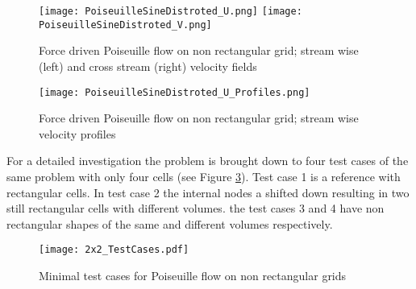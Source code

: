 \documentclass[
	pdftex,             %
	12pt,				%
	a4paper,		   	%
	english,				%
	oneside,			%
]{article}
\begin{document}
\begin{figure}[ht!]
\texttt{[image: PoiseuilleSineDistroted\_U.png]}
\texttt{[image: PoiseuilleSineDistroted\_V.png]}
\caption{Force driven Poiseuille flow on non rectangular grid; stream wise (left) and cross stream (right) velocity fields}
\label{fig:Poseieuille16x16}
\end{figure}

\begin{figure}[ht!]
\center
\texttt{[image: PoiseuilleSineDistroted\_U\_Profiles.png]}
\caption{Force driven Poiseuille flow on non rectangular grid; stream wise velocity profiles}
\label{fig:Poseieuille16x16_Profiles}
\end{figure}

For a detailed investigation the problem is brought down to four test cases of the same problem with only four cells (see Figure \ref{fig:Poseieuille2x2_Mesh}). Test case 1 is a reference with rectangular cells. In test case 2 the internal nodes a shifted down resulting in two still rectangular cells with different volumes. the test cases 3 and 4 have non rectangular shapes of the same and different volumes respectively. 

\begin{figure}[ht!]
\center
\texttt{[image: 2x2\_TestCases.pdf]}
\caption{Minimal test cases for Poiseuille flow on non rectangular grids}
\label{fig:Poseieuille2x2_Mesh}
\end{figure}
\end{document}
